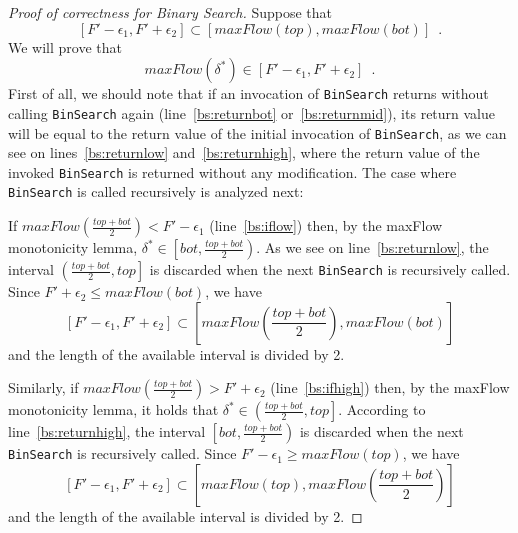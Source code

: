 \begin{proof}[Proof of correctness for Binary Search]
  Suppose that
  \begin{equation*}
    \left[F' - \epsilon_1, F' + \epsilon_2\right] \subset \left[maxFlow\left(top\right), maxFlow\left(bot\right)\right]
    \enspace.
  \end{equation*}
  We will prove that
  \begin{equation*}
    maxFlow\left(\delta^*\right) \in \left[F' - \epsilon_1, F' + \epsilon_2\right] \enspace.
  \end{equation*}
  First of all, we should note that if an invocation of \texttt{BinSearch} returns without calling \texttt{BinSearch} again
  (line~\ref{bs:returnbot} or~\ref{bs:returnmid}), its return value will be equal to the return value of the initial
  invocation of \texttt{BinSearch}, as we can see on lines~\ref{bs:returnlow} and~\ref{bs:returnhigh}, where the return
  value of the invoked \texttt{BinSearch} is returned without any modification. The case where \texttt{BinSearch} is called
  recursively is analyzed next:

  If $maxFlow\left(\frac{top+bot}{2}\right) < F' - \epsilon_1$ (line~\ref{bs:iflow}) then, by the maxFlow monotonicity
  lemma, $\delta^* \in \left[bot,\frac{top+bot}{2}\right)$. As we see on line~\ref{bs:returnlow}, the interval
  $\left(\frac{top+bot}{2}, top\right]$ is discarded when the next \texttt{BinSearch} is recursively called. Since
  $F' + \epsilon_2 \leq maxFlow\left(bot\right)$, we have
  \begin{equation*}
    \left[F' - \epsilon_1, F' + \epsilon_2\right] \subset \left[maxFlow\left(\frac{top+bot}{2}\right),
    maxFlow\left(bot\right)\right]
  \end{equation*}
  and the length of the available interval is divided by 2.

  Similarly, if $maxFlow\left(\frac{top+bot}{2}\right) > F' + \epsilon_2$ (line~\ref{bs:ifhigh}) then, by the maxFlow
  monotonicity lemma, it holds that $\delta^* \in \left(\frac{top+bot}{2}, top\right]$. According to
  line~\ref{bs:returnhigh}, the interval $\left[bot, \frac{top+bot}{2}\right)$ is discarded when the next
  \texttt{BinSearch} is recursively called. Since $F'- \epsilon_1 \geq maxFlow\left(top\right)$, we have
  \begin{equation*}
    \left[F' - \epsilon_1, F' + \epsilon_2\right] \subset \left[maxFlow\left(top\right),
    maxFlow\left(\frac{top+bot}{2}\right)\right]
  \end{equation*}
  and the length of the available interval is divided by 2.


\end{proof}
